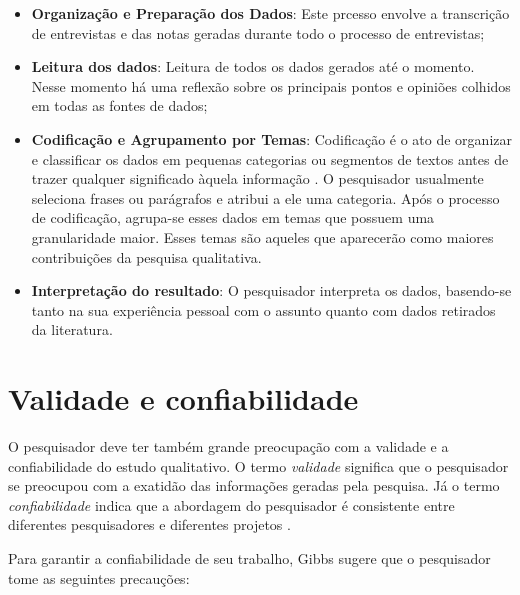 \begin{itemize}

	\item \textbf{Organização e Preparação dos Dados}: Este prcesso
	envolve a transcrição de entrevistas e das notas geradas durante todo o 
	processo de entrevistas;
	
	\item \textbf{Leitura dos dados}: Leitura de todos os dados gerados até o
	momento. Nesse momento há uma reflexão sobre os principais pontos e opiniões 
	colhidos em todas as fontes de dados;
	
	\item \textbf{Codificação e Agrupamento por Temas}:	Codificação é o ato de
	organizar e classificar os dados em pequenas categorias ou segmentos de textos 
	antes de trazer qualquer significado àquela informação \cite{rossman}. O
	pesquisador usualmente seleciona frases ou parágrafos e atribui a ele uma
	categoria. Após o processo de codificação, agrupa-se esses dados em
	temas que possuem uma granularidade maior. Esses temas são aqueles que 
	aparecerão como maiores contribuições da pesquisa qualitativa.
	
	\item \textbf{Interpretação do resultado}: O pesquisador interpreta os dados, 
	basendo-se tanto na sua experiência pessoal com o assunto quanto com dados 
	retirados da literatura.

\end{itemize}

\section{Validade e confiabilidade}

O pesquisador deve ter também grande preocupação com a validade e a
confiabilidade do estudo qualitativo. O termo \textit{validade} significa que o
pesquisador se preocupou com a exatidão das informações geradas pela pesquisa.
Já o termo \textit{confiabilidade} indica que a abordagem do pesquisador é
consistente entre diferentes pesquisadores e diferentes projetos
\cite{gibbs-2007}.

Para garantir a confiabilidade de seu trabalho, Gibbs \cite{gibbs-2007} sugere
que o pesquisador tome as seguintes precauções:

